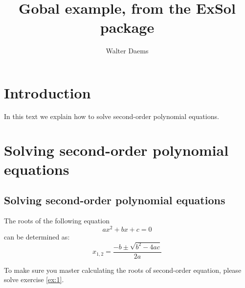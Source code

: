 \documentclass[a4paper,10pt]{article}
\title{Gobal example, from the \textsf{ExSol} package}
\author{Walter Daems}
\begin{document}
\maketitle

\section{Introduction}

In this text we explain how to solve second-order polynomial
equations.

\section{Solving second-order polynomial equations}

\begin{informulacollectiononly}
\section*{Solving second-order polynomial equations}
\end{informulacollectiononly}
\begin{informulacollection}
  The roots of the following equation
  \begin{equation}
    a x^2 + bx + c = 0
  \end{equation}
  can be determined as:
  \begin{equation}
    x_{1,2} = \frac{-b \pm \sqrt{b^2 - 4 a c}}{2 a}
  \end{equation}
\end{informulacollection}

To make sure you master calculating the roots of second-order
equation, please solve exercise \ref{ex:1}.
\end{document}
